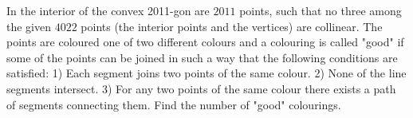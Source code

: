 In the interior of the convex 2011-gon are $2011$ points, such that no three among the given $4022$ points (the interior points and the vertices) are collinear. The points are coloured one of two different colours and a colouring is called "good" if some of the points can be joined  in such a way that the following conditions are satisfied:
1) Each segment joins two points of the same colour.
2) None of the line segments intersect.
3) For any two points of the same colour there exists a path of segments connecting them.
Find the number of "good" colourings.